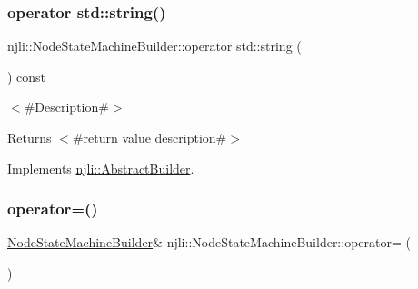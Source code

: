 \subsubsection{\texorpdfstring{operator std\+::string()}{operator std::string()}}
{\footnotesize\ttfamily njli\+::\+Node\+State\+Machine\+Builder\+::operator std\+::string (\begin{DoxyParamCaption}{ }\end{DoxyParamCaption}) const\hspace{0.3cm}{\ttfamily [virtual]}}

$<$\#\+Description\#$>$

\begin{DoxyReturn}{Returns}
$<$\#return value description\#$>$ 
\end{DoxyReturn}


Implements \mbox{\hyperlink{classnjli_1_1_abstract_builder_a3e6e553e06d1ca30517ad5fb0bd4d000}{njli\+::\+Abstract\+Builder}}.

\mbox{\label{classnjli_1_1_node_state_machine_builder_ab9a6bcd9224410910230f1bb8568d8fe}} 
\subsubsection{\texorpdfstring{operator=()}{operator=()}}
{\footnotesize\ttfamily \mbox{\hyperlink{classnjli_1_1_node_state_machine_builder}{Node\+State\+Machine\+Builder}}\& njli\+::\+Node\+State\+Machine\+Builder\+::operator= (\begin{DoxyParamCaption}\item[{const \mbox{\hyperlink{classnjli_1_1_node_state_machine_builder}{Node\+State\+Machine\+Builder}} \&}]{ }\end{DoxyParamCaption})\hspace{0.3cm}{\ttfamily [protected]}}

\mbox{\label{classnjli_1_1_node_state_machine_builder_a4a32ceed262f528512eaab3d7e4571ba}} 
